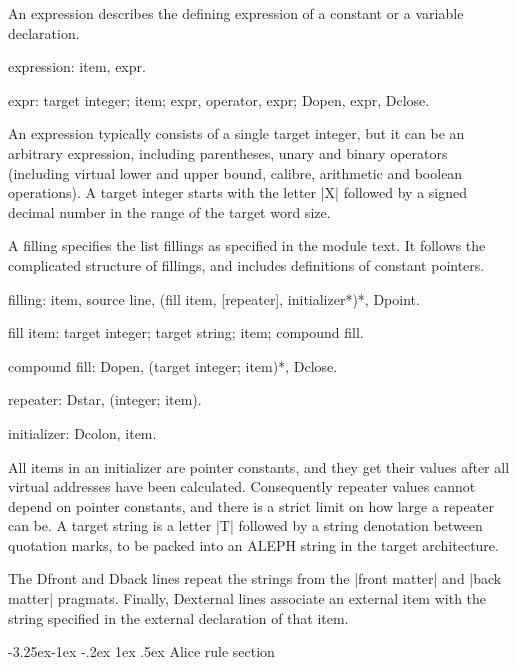 \documentclass[titlepage]{article}
\makeatletter
\newcommand\A{\textsf{ALEPH}}
\newcommand\g[1]{\textsf{#1}}
\newenvironment{grammar}{%
\begin{list}{}{%
\setlength\leftmargin{18pt}%
\setlength\rightmargin{-5pt}%
\setlength\listparindent{20pt}%
\setlength\itemsep{1pt plus0.2ex}%
\setlength\parsep{0pt plus 2pt}%
\setlength\labelsep{-5pt}%
}\sf\mkoptions%
}{\end{list}}
\renewcommand\subsection{%
\@startsection{subsection}{2}{\z@}%
   {-3.25ex\@plus -1ex \@minus -.2ex}%
   {1ex \@plus .5ex}%
   {\normalfont\normalsize\bfseries}}
\makeatother
\begin{document}
\smallskip

An \g{expression} describes the defining expression of a \g{constant} or a
\g{variable} declaration.
\begin{grammar}
\item expression: item, expr.
\item expr: target integer; item; expr, operator, expr; Dopen, expr, Dclose.
\end{grammar}
An \g{expression} typically consists of a single target integer, but it can be
an arbitrary expression, including parentheses, unary and binary operators
(including virtual lower and upper bound, calibre, arithmetic and boolean
operations). A \g{target integer} starts with the letter \pp|X| followed by
a signed decimal number in the range of the target word size.

\smallskip

A \g{filling} specifies the list fillings as specified in the module text. It 
follows the complicated structure of fillings, and includes definitions of
constant pointers.
\begin{grammar}
\item filling: item, source line, (fill item, [repeater], 
initializer*)*, Dpoint.
\item fill item: target integer; target string; item; compound fill.
\item compound fill: Dopen, (target integer; item)*, Dclose.
\item repeater: Dstar, (integer; item).
\item initializer: Dcolon, item. 
\end{grammar}
All \g{item}s in an \g{initializer} are pointer constants, and they get
their values after all virtual addresses have been calculated. Consequently repeater
values cannot depend on pointer constants, and there is a strict limit on
how large a repeater can be. A \g{target string} is a letter \pp|T| followed
by a string denotation between quotation marks, to be packed into an \A{} string
in the target architecture.

\smallskip

The \g{Dfront} and \g{Dback} lines repeat the strings from the
\pp|front matter| and \pp|back matter| pragmats. Finally, \g{Dexternal} lines
associate an external item with the string specified in the external declaration 
of that item.

\subsection{Alice rule section}
\end{document}
